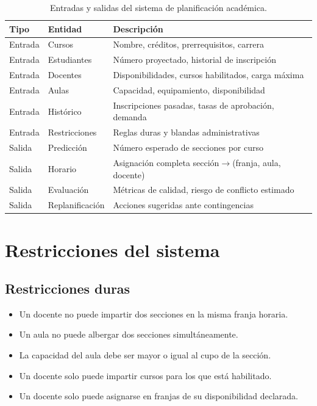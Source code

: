 \documentclass[12pt,twoside]{report}
\theoremstyle{definition}
\begin{document}
\begin{table}[H]
\centering
\caption{Entradas y salidas del sistema de planificaci\'on acad\'emica.}
\label{tab:io}
\begin{tabularx}{\linewidth}{llX}
\toprule
\textbf{Tipo} & \textbf{Entidad} & \textbf{Descripci\'on} \\
\midrule
Entrada & Cursos          & Nombre, cr\'editos, prerrequisitos, carrera \\
Entrada & Estudiantes     & N\'umero proyectado, historial de inscripci\'on \\
Entrada & Docentes        & Disponibilidades, cursos habilitados, carga m\'axima \\
Entrada & Aulas           & Capacidad, equipamiento, disponibilidad \\
Entrada & Hist\'orico     & Inscripciones pasadas, tasas de aprobaci\'on, demanda \\
Entrada & Restricciones   & Reglas duras y blandas administrativas \\
\midrule
Salida  & Predicci\'on    & N\'umero esperado de secciones por curso \\
Salida  & Horario         & Asignaci\'on completa secci\'on$\to$(franja, aula, docente) \\
Salida  & Evaluaci\'on    & M\'etricas de calidad, riesgo de conflicto estimado \\
Salida  & Replanificaci\'on & Acciones sugeridas ante contingencias \\
\bottomrule
\end{tabularx}
\end{table}

\vspace{4cm}

\section{Restricciones del sistema}

\subsection{Restricciones duras}
\begin{itemize}[leftmargin=2em,itemsep=3pt]
  \item Un docente no puede impartir dos secciones en la misma franja horaria.
  \item Un aula no puede albergar dos secciones simult\'aneamente.
  \item La capacidad del aula debe ser mayor o igual al cupo de la secci\'on.
  \item Un docente solo puede impartir cursos para los que est\'a habilitado.
  \item Un docente solo puede asignarse en franjas de su disponibilidad declarada.
\end{itemize}
\end{document}
